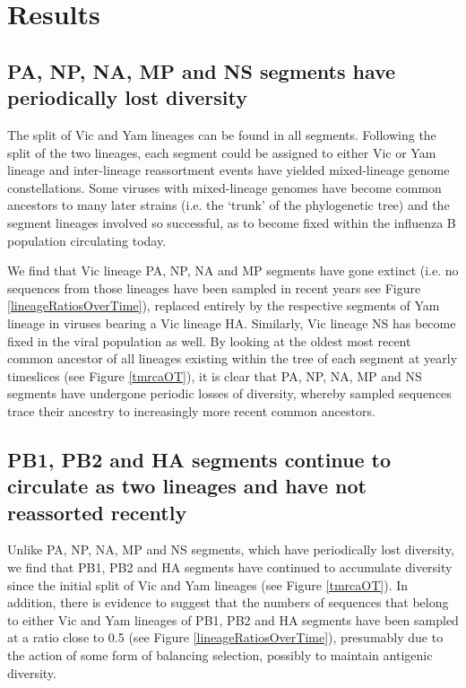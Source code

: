 \documentclass[11pt,oneside,letterpaper]{article}
\begin{document}
\section*{Results}

\subsection*{PA, NP, NA, MP and NS segments have periodically lost diversity}
The split of Vic and Yam lineages can be found in all segments.
Following the split of the two lineages, each segment could be assigned to either Vic or Yam lineage and inter-lineage reassortment events have yielded mixed-lineage genome constellations.
Some viruses with mixed-lineage genomes have become common ancestors to many later strains (i.e. the `trunk' of the phylogenetic tree) and the segment lineages involved so successful, as to become fixed within the influenza B population circulating today.

We find that Vic lineage PA, NP, NA and MP segments have gone extinct (i.e. no sequences from those lineages have been sampled in recent years see Figure \ref{lineageRatiosOverTime}), replaced entirely by the respective segments of Yam lineage in viruses bearing a Vic lineage HA.
Similarly, Vic lineage NS has become fixed in the viral population as well.
By looking at the oldest most recent common ancestor of all lineages existing within the tree of each segment at yearly timeslices (see Figure \ref{tmrcaOT}), it is clear that PA, NP, NA, MP and NS segments have undergone periodic losses of diversity, whereby sampled sequences trace their ancestry to increasingly more recent common ancestors.


\subsection*{PB1, PB2 and HA segments continue to circulate as two lineages and have not reassorted recently}
Unlike PA, NP, NA, MP and NS segments, which have periodically lost diversity, we find that PB1, PB2 and HA segments have continued to accumulate diversity since the initial split of Vic and Yam lineages (see Figure \ref{tmrcaOT}).
In addition, there is evidence to suggest that the numbers of sequences that belong to either Vic and Yam lineages of PB1, PB2 and HA segments have been sampled at a ratio close to 0.5 (see Figure \ref{lineageRatiosOverTime}), presumably due to the action of some form of balancing selection, possibly to maintain antigenic diversity.
\end{document}

